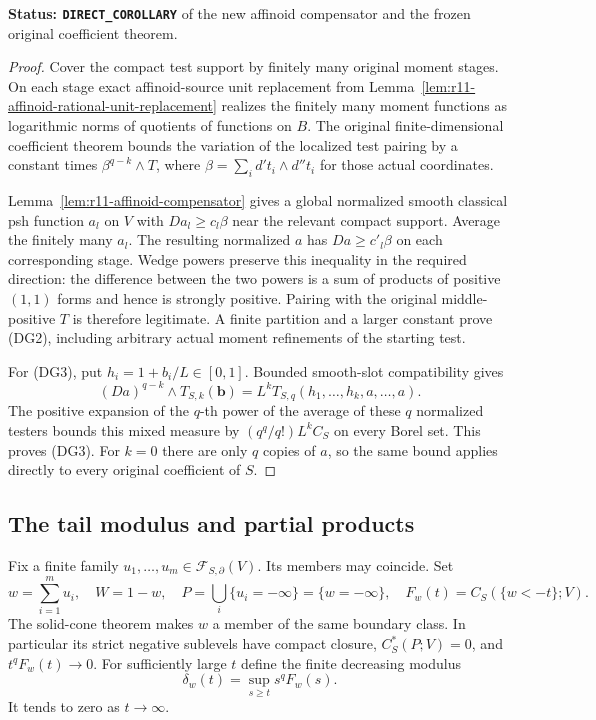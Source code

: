 \documentclass[11pt,a4paper]{article}
\numberwithin{equation}{section}
\theoremstyle{definition}
\theoremstyle{remark}
\begin{document}
\noindent\textbf{Status: \texttt{DIRECT\_COROLLARY}} of the new
affinoid compensator and the frozen original coefficient theorem.

\begin{proof}
Cover the compact test support by finitely many original moment
stages. On each stage exact affinoid-source unit replacement from
Lemma~\ref{lem:r11-affinoid-rational-unit-replacement} realizes
the finitely many moment functions as logarithmic norms of
quotients of functions on $B$. The original finite-dimensional
coefficient theorem bounds the variation of the localized test
pairing by a constant times
$\beta^{q-k}\wedge T$, where
$\beta=\sum_i d't_i\wedge d''t_i$ for those actual coordinates.

Lemma~\ref{lem:r11-affinoid-compensator} gives a global normalized
smooth classical psh function $a_l$ on $V$ with
$Da_l\geq c_l\beta$ near the relevant compact support.
Average the finitely many $a_l$. The resulting normalized $a$
has $Da\geq c'_l\beta$ on each corresponding stage. Wedge powers
preserve this inequality in the required direction: the difference
between the two powers is a sum of products of positive $(1,1)$
forms and hence is strongly positive. Pairing with the original
middle-positive $T$ is therefore legitimate. A finite partition
and a larger constant prove (DG2), including arbitrary actual
moment refinements of the starting test.

For (DG3), put $h_i=1+b_i/L\in[0,1]$. Bounded smooth-slot
compatibility gives
\[
 (Da)^{q-k}\wedge T_{S,k}(\mathbf b)
     =L^kT_{S,q}(h_1,\ldots,h_k,a,\ldots,a).
\]
The positive expansion of the $q$-th power of the average of
these $q$ normalized testers bounds this mixed measure by
$(q^q/q!)L^k C_S$ on every Borel set. This proves (DG3).
For $k=0$ there are only $q$ copies of $a$, so the same bound
applies directly to every original coefficient of $S$.
\end{proof}

\subsection{The tail modulus and partial products}

Fix a finite family $u_1,\ldots,u_m\in\mathcal F_{S,\partial}(V)$.
Its members may coincide. Set
\[
 w=\sum_{i=1}^m u_i,\quad W=1-w,\quad
 P=\bigcup_i\{u_i=-\infty\}=\{w=-\infty\},
 \quad
 F_w(t)=C_S(\{w<-t\};V).
 \tag{DG4}
\]
The solid-cone theorem makes $w$ a member of the same boundary
class. In particular its strict negative sublevels have compact
closure, $C_S^*(P;V)=0$, and $t^qF_w(t)\to0$.
For sufficiently large $t$ define the finite decreasing modulus
\[
                 \delta_w(t)=\sup_{s\geq t}s^qF_w(s).
 \tag{DG5}
\]
It tends to zero as $t\to\infty$.
\end{document}
